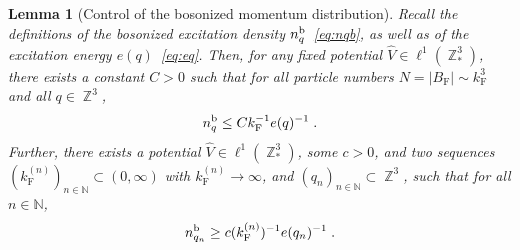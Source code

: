\documentclass[12pt,a4paper]{article}
\numberwithin{equation}{section}
\newcommand{\NNN}{\mathbb{N}}
\newcommand{\1}{\mathbb{I}}
\renewcommand{\b}{\textnormal{b}}
\newcommand{\F}{\mathrm{F}}
\DeclareMathOperator{\Z}{\mathbb{Z}}
\theoremstyle{plain}
\newtheorem{lemma}[theorem]{Lemma}
\theoremstyle{definition}
\theoremstyle{remark}
\theoremstyle{plain}
\theoremstyle{definition}
\theoremstyle{remark}
\begin{document}
\begin{lemma}[Control of the bosonized momentum distribution] \label{lem:nqb_bounds}
Recall the definitions of the bosonized excitation density $ n_q^{\b} $~\eqref{eq:nqb}, as well as of the excitation energy $ e(q) $~\eqref{eq:eq}. Then, for any fixed potential $ \hat{V} \in \ell^1(\Z^3_*) $, there exists a constant $ C > 0 $ such that for all particle numbers $ N = |B_{\F}| \sim k_{\F}^3 $ and all $ q \in \Z^3 $,
\begin{equation} \label{eq:nqb_upperbound}
	n_q^{\b}
	\le C k_{\F}^{-1} e(q)^{-1} \;.
\end{equation}
Further, there exists a potential $ \hat{V} \in \ell^1(\Z^3_*) $, some $ c > 0 $, and two sequences $ (k_{\F}^{(n)})_{n \in \NNN} \subset (0,\infty) $ with $ k_{\F}^{(n)} \to \infty $, and $ (q_n)_{n \in \NNN} \subset \Z^3 $, such that for all $ n \in \NNN $,
\begin{equation} \label{eq:nqb_lowerbound}
	n_{q_n}^{\b}
	\ge c (k_{\F}^{(n)})^{-1} e(q_n)^{-1} \;.
\end{equation}
\end{lemma}
\end{document}
